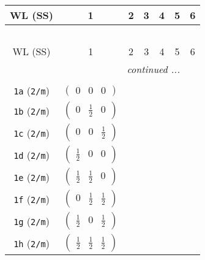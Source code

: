\documentclass[fleqn,9pt,landscape]{jsarticle}
\begin{document}
\begin{center}
\renewcommand{\arraystretch}{1.2}
\begin{longtable}{ccccccc}
 \hline \hline
WL (SS) & 1 & 2 & 3 & 4 & 5 & 6 \\ \hline \endfirsthead

\multicolumn{6}{l}{\tablename\ \thetable{}} \\
 \hline \hline
WL (SS) & 1 & 2 & 3 & 4 & 5 & 6 \\ \hline \endhead

 \hline \hline
\multicolumn{6}{r}{\footnotesize\it continued ...} \\ \endfoot

 \hline \hline
\multicolumn{6}{r}{} \\ \endlastfoot

{\tt 1a} ({\tt 2/m}) & $ \begin{pmatrix} 0 & 0 & 0 \end{pmatrix} $ & $  $ & $  $ & $  $ \\ \hline
{\tt 1b} ({\tt 2/m}) & $ \begin{pmatrix} 0 & \frac{1}{2} & 0 \end{pmatrix} $ & $  $ & $  $ & $  $ \\ \hline
{\tt 1c} ({\tt 2/m}) & $ \begin{pmatrix} 0 & 0 & \frac{1}{2} \end{pmatrix} $ & $  $ & $  $ & $  $ \\ \hline
{\tt 1d} ({\tt 2/m}) & $ \begin{pmatrix} \frac{1}{2} & 0 & 0 \end{pmatrix} $ & $  $ & $  $ & $  $ \\ \hline
{\tt 1e} ({\tt 2/m}) & $ \begin{pmatrix} \frac{1}{2} & \frac{1}{2} & 0 \end{pmatrix} $ & $  $ & $  $ & $  $ \\ \hline
{\tt 1f} ({\tt 2/m}) & $ \begin{pmatrix} 0 & \frac{1}{2} & \frac{1}{2} \end{pmatrix} $ & $  $ & $  $ & $  $ \\ \hline
{\tt 1g} ({\tt 2/m}) & $ \begin{pmatrix} \frac{1}{2} & 0 & \frac{1}{2} \end{pmatrix} $ & $  $ & $  $ & $  $ \\ \hline
{\tt 1h} ({\tt 2/m}) & $ \begin{pmatrix} \frac{1}{2} & \frac{1}{2} & \frac{1}{2} \end{pmatrix} $ & $  $ & $  $ & $  $ \\ \hline

\end{longtable}
\end{center}
\end{document}

